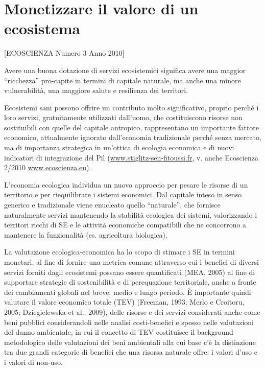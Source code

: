 \documentclass[11pt,a4paper]{article}
\begin{document}
	\section{Monetizzare il valore di un ecosistema}

	[ECOSCIENZA Numero 3 Anno 2010]
	
	
	Avere una buona dotazione di servizi ecosistemici significa avere una maggior ``ricchezza'' pro-capite in termini di capitale naturale, ma anche una minore  vulnerabilità, una maggiore salute e resilienza dei territori.
	
	Ecosistemi sani possono offrire un contributo molto significativo, proprio perché i loro servizi, gratuitamente utilizzati dall'uomo, che costituiscono risorse non sostituibili con quelle del capitale antropico, rappresentano un importante fattore economico, attualmente ignorato dall'economia tradizionale perché senza mercato, ma di importanza strategica in un'ottica di ecologia economica e di nuovi indicatori di integrazione del Pil (\url{www.stiglitz-sen-fitoussi.fr}, v. anche Ecoscienza 2/2010 \url{www.ecoscienza.eu}).
	
	L'economia ecologica individua un nuovo approccio per pesare le risorse di un territorio e per riequilibrare i sistemi economici. Dal capitale inteso in senso generico e tradizionale viene enucleato quello ``naturale'', che fornisce naturalmente servizi mantenendo la stabilità ecologica dei sistemi, valorizzando i territori ricchi di SE e le attività economiche compatibili che ne concorrono a mantenere la funzionalità (es. agricoltura biologica). 
	
	La valutazione ecologica-economica ha lo scopo di stimare i SE in termini monetari, al fine di fornire una metrica comune
	attraverso cui i benefici di diversi servizi forniti dagli ecosistemi possano essere quantificati (MEA, 2005) al fine di
	supportare strategie di sostenibilità e di perequazione territoriale, anche a fronte dei cambiamenti globali nel breve, medio e lungo periodo. È importante quindi valutare il valore economico totale (TEV) (Freeman, 1993; Merlo e Croitoru, 2005; Dziegielewska et al., 2009), delle risorse e dei servizi considerati anche come beni pubblici considerandoli nelle analisi costi-benefici e spesso nelle valutazioni del danno ambientale, in cui il concetto di TEV costituisce il background
	metodologico delle valutazioni dei beni ambientali alla cui base c'è la distinzione tra due grandi categorie di benefici che una risorsa naturale offre: i valori d'uso e i valori di non-uso.  
	
\end{document}
